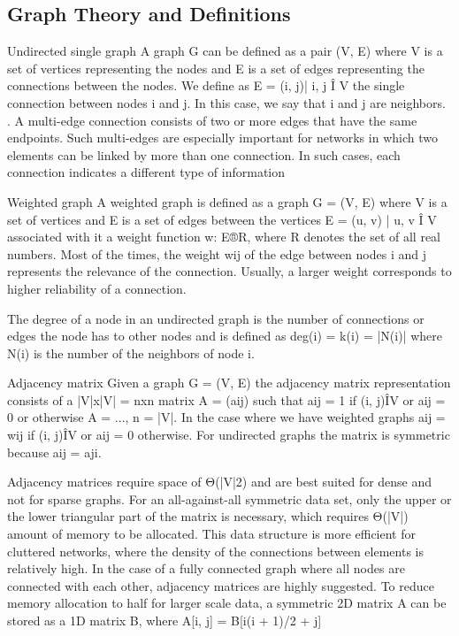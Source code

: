 
\subsection{Graph Theory and Definitions}

Undirected single graph
A graph G can be defined as a pair (V, E) where V is a set of vertices representing the
nodes and E is a set of edges representing the connections between the nodes. We
define as E = {(i, j)| i, j Î V} the single connection between nodes i and j. In this case,
we say that i and j are neighbors. . A multi-edge connection consists of two or more
edges that have the same endpoints. Such multi-edges are especially important for networks 
in which two elements can be linked by more than one connection. In such
cases, each connection indicates a different type of information

Weighted graph
A weighted graph is defined as a graph G = (V, E) where V is a set of vertices and E is
a set of edges between the vertices E = {(u, v) | u, v Î V} associated with it a weight
function w: E®R, where R denotes the set of all real numbers. Most of the times, the
weight wij of the edge between nodes i and j represents the relevance of the connection. 
Usually, a larger weight corresponds to higher reliability of a connection.


The degree of a node in an undirected graph is the number of connections or edges
the node has to other nodes and is defined as deg(i) = k(i) = |N(i)| where N(i) is the
number of the neighbors of node i.


Adjacency matrix
Given a graph G = (V, E) the adjacency matrix representation consists of a |V|x|V| =
nxn matrix A = (aij) such that aij = 1 if (i, j)ÎV or aij = 0 or otherwise
A = ..., n = |V|. In the case where we have weighted graphs aij = wij if (i,
j)ÎV or aij = 0 otherwise. For undirected graphs the matrix is symmetric because aij
= aji.


Adjacency matrices require space of Θ(|V|2) and are best suited for dense and not for
sparse graphs. For an all-against-all symmetric data set, only the upper or the lower
triangular part of the matrix is necessary, which requires Θ(|V|) amount of memory to
be allocated. This data structure is more efficient for cluttered networks, where the
density of the connections between elements is relatively high. In the case of a fully
connected graph where all nodes are connected with each other, adjacency matrices
are highly suggested. To reduce memory allocation to half for larger scale data, a symmetric 
2D matrix A can be stored as a 1D matrix B, where A[i, j] = B[i(i + 1)/2 + j]

\cite{Pavlopoulos2011}
